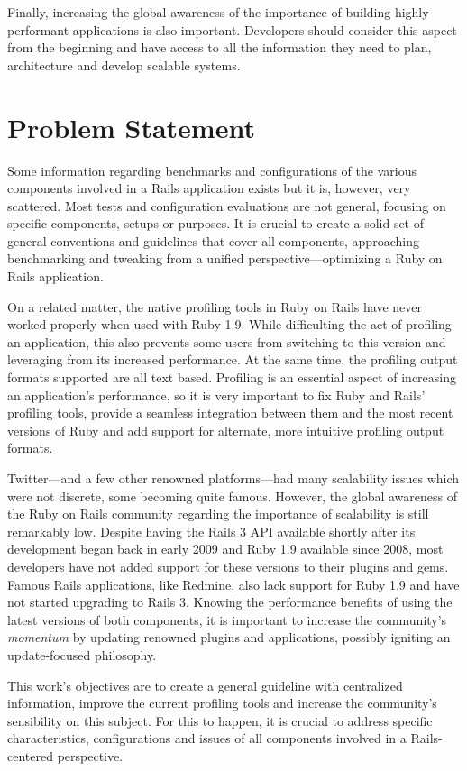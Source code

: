 \documentclass[9pt,a4paper]{extarticle}
\begin{document}
\begin{multicols}{2}
Finally, increasing the global awareness of the importance of building highly performant applications is also important. Developers should consider this aspect from the beginning and have access to all the information they need to plan, architecture and develop scalable systems.


\section{Problem Statement}
Some information regarding benchmarks and configurations of the various components involved in a Rails application exists but it is, however, very scattered. Most tests and configuration evaluations are not general, focusing on specific components, setups or purposes. It is crucial to create a solid set of general conventions and guidelines that cover all components, approaching benchmarking and tweaking from a unified perspective---optimizing a Ruby on Rails application.

On a related matter, the native profiling tools in Ruby on Rails have never worked properly when used with Ruby 1.9. While difficulting the act of profiling an application, this also prevents some users from switching to this version and leveraging from its increased performance. At the same time, the profiling output formats supported are all text based. Profiling is an essential aspect of increasing an application's performance, so it is very important to fix Ruby and Rails' profiling tools, provide a seamless integration between them and the most recent versions of Ruby and add support for alternate, more intuitive profiling output formats.

Twitter---and a few other renowned platforms---had many scalability issues which were not discrete, some becoming quite famous. However, the global awareness of the Ruby on Rails community regarding the importance of scalability is still remarkably low. Despite having the Rails 3 API available shortly after its development began back in early 2009 and Ruby 1.9 available since 2008, most developers have not added support for these versions to their plugins and gems. Famous Rails applications, like Redmine, also lack support for Ruby 1.9 and have not started upgrading to Rails 3. Knowing the performance benefits of using the latest versions of both components, it is important to increase the community's \textit{momentum} by updating renowned plugins and applications, possibly igniting an update-focused philosophy.

This work's objectives are to create a general guideline with centralized information, improve the current profiling tools and increase the community's sensibility on this subject. For this to happen, it is crucial to address specific characteristics, configurations and issues of all components involved in a Rails-centered perspective.



\end{multicols}
\end{document}
